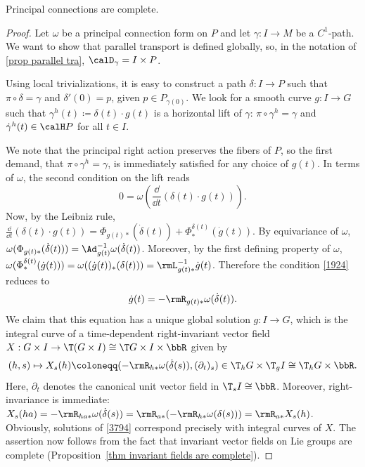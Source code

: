 \begin{prop}
    Principal connections are complete.
\end{prop}
\begin{proof}
    Let $\omega$ be a principal connection form on $P$ and let $\gamma:I\to M$ be a $C^1$-path. We want to show that parallel transport is defined globally, so, in the notation of \ref{prop parallel tra}, $\calD_\gamma=I\times P$.

    Using local trivializations, it is easy to construct a path $\delta:I\to P$ such that $\pi\circ\delta=\gamma$ and $\delta'(0)=p$, given $p\in P_{\gamma(0)}$. We look for a smooth curve $g:I\to G$ such that $\gamma^h(t)\coloneqq \delta(t)\cdot g(t)$ is a horizontal lift of $\gamma$: $\pi\circ\gamma^h=\gamma$ and $\dot\gamma^h(t)\in \calH P$ for all $t\in I$. 

    We note that the principal right action preserves the fibers of $P$, so the first demand, that $\pi\circ \gamma^h=\gamma$, is immediately satisfied for any choice of $g(t)$. In terms of $\omega$, the second condition on the lift reads
    \[0=\omega\left(\frac{\dd}{\dd t}(\delta(t)\cdot g(t))\right).\label{1924}\]
    Now, by the Leibniz rule, $\frac{\dd}{\dd t}(\delta(t)\cdot g(t))=\Phi_{g(t)\ast}(\dot\delta(t))+\Phi^{\delta(t)}_\ast(\dot g(t))$. By equivariance of $\omega$, $\omega(\Phi_{g(t)\ast}(\dot\delta(t)))=\Ad_{g(t)}^{-1}\omega(\dot\delta(t))$. Moreover, by the first defining property of $\omega$, $\omega(\Phi^{\delta(t)}_\ast(\dot g(t)))=\omega((\dot g(t))_{\ast}(\delta(t)))=\rmL_{g(t)\ast}^{-1}\dot g(t)$. Therefore the condition \eqref{1924} reduces to
    \[\dot g(t)=-\rmR_{g(t)\ast}\omega(\dot\delta(t)).\label{3794}\]
    We claim that this equation has a unique global solution $g:I\to G$, which is the integral curve of a time-dependent right-invariant vector field $X: G\times I\to \T(G\times I)\cong \T G\times I\times \bbR$ given by
    \[(h,s)\mapsto X_s(h)\coloneqq (-\rmR_{h\ast}\omega(\dot\delta(s)),(\partial_t)_s)\in \T_hG\times \T_gI\cong \T_hG\times \bbR.\]
    Here, $\partial_t$ denotes the canonical unit vector field in $\T_sI\cong\bbR$. Moreover, right-invariance is immediate: $X_s(ha)=-\rmR_{ha\ast}\omega(\dot\delta(s))=\rmR_{a\ast}(-\rmR_{h\ast}\omega(\delta(s)))=\rmR_{a\ast}X_s(h)$. Obviously, solutions of \eqref{3794} correspond precisely with integral curves of $X$. The assertion now follows from the fact that invariant vector fields on Lie groups are complete (Proposition~\ref{thm invariant fields are complete}).
\end{proof}

